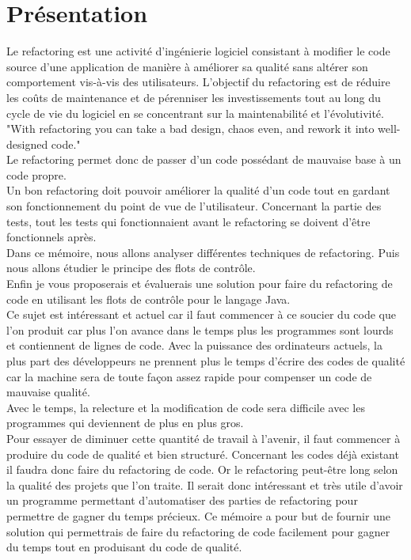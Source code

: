 \documentclass[a4paper,twoside,12pt,openright]{report}
\begin{document}
\section{Présentation}
Le refactoring est une activité d'ingénierie logiciel consistant à modifier le code source d'une application de manière à améliorer sa qualité sans altérer son comportement vis-à-vis des utilisateurs.
L'objectif du refactoring est de réduire les coûts de maintenance et de pérenniser les investissements tout au long du cycle de vie du logiciel en se concentrant sur la maintenabilité et l'évolutivité.\cite{ref1}\\
"With refactoring you can take a bad design, chaos even, and rework it into well-designed code."\cite{ref2}\\
Le refactoring permet donc de passer d'un code possédant de mauvaise base à un code propre.\\
Un bon refactoring doit pouvoir améliorer la qualité d'un code tout en gardant son fonctionnement du point de vue de l'utilisateur. Concernant la partie des tests, tout les tests qui fonctionnaient avant le refactoring se doivent d'être fonctionnels après.\\
Dans ce mémoire, nous allons analyser différentes techniques de refactoring. Puis nous allons étudier le principe des flots de contrôle.\\ Enfin je vous proposerais et évaluerais une solution pour faire du refactoring de code en utilisant les flots de contrôle pour le langage Java.\\
Ce sujet est intéressant et actuel car il faut commencer à ce soucier du code que l'on produit car plus l'on avance dans le temps plus les programmes sont lourds et contiennent de lignes de code. Avec la puissance des ordinateurs actuels, la plus part des développeurs ne prennent plus le temps d'écrire des codes de qualité car la machine sera de toute façon assez rapide pour compenser un code de mauvaise qualité.\cite{ref3}\\
Avec le temps, la relecture et la modification de code sera difficile avec les programmes qui deviennent de plus en plus gros.\cite{ref3}\\
Pour essayer de diminuer cette quantité de travail à l'avenir, il faut commencer à produire du code de qualité et bien structuré. Concernant les codes déjà existant il faudra donc faire du refactoring de code. Or le refactoring peut-être long selon la qualité des projets que l'on traite. Il serait donc intéressant et très utile d'avoir un programme permettant d'automatiser des parties de refactoring pour permettre de gagner du temps précieux. 
Ce mémoire a pour but de fournir une solution qui permettrais de faire du refactoring de code facilement pour gagner du temps tout en produisant du code de qualité.


\end{document}
